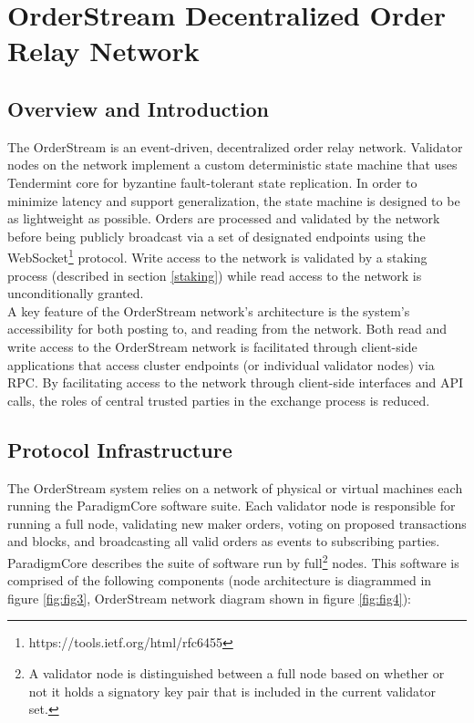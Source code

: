 \documentclass[9pt]{article}
\begin{document}
\clearpage
\pagebreak


\section{OrderStream Decentralized Order Relay Network}\label{orderstream}

\subsection{Overview and Introduction}\label{orderstream introduction}

\noindent The OrderStream is an event-driven, decentralized order relay network. Validator nodes on the network implement a custom deterministic state machine that uses Tendermint core for byzantine fault-tolerant state replication\cite{tendermint}. In order to minimize latency and support generalization, the state machine is designed to be as lightweight as possible. Orders are processed and validated by the network before being publicly broadcast via a set of designated endpoints using the WebSocket\footnote{https://tools.ietf.org/html/rfc6455} protocol. Write access to the network is validated by a staking process (described in section \ref{staking}) while read access to the network is unconditionally granted. \\

\noindent A key feature of the OrderStream network’s architecture is the system’s accessibility for both posting to, and reading from the network. Both read and write access to the OrderStream network is facilitated through client-side applications that access cluster endpoints (or individual validator nodes) via RPC. By facilitating access to the network through client-side interfaces and API calls, the roles of central trusted parties in the exchange process is reduced.

\subsection{Protocol Infrastructure}

\noindent The OrderStream system relies on a network of physical or virtual machines each running the ParadigmCore software suite. Each validator node is responsible for running a full node, validating new maker orders, voting on proposed transactions and blocks, and broadcasting all valid orders as events to subscribing parties. ParadigmCore describes the suite of software run by full\footnote{A validator node is distinguished between a full node based on whether or not it holds a signatory key pair that is included in the current validator set.} nodes. This software is comprised of the following components (node architecture is diagrammed in figure \ref{fig:fig3}, OrderStream network diagram shown in figure \ref{fig:fig4}):
\end{document}
